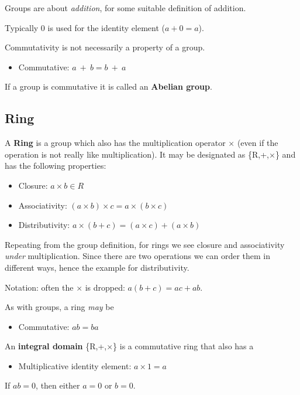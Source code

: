 \documentclass[11pt, oneside]{article}
\begin{document}
Groups are about \emph{addition}, for some suitable definition of addition.

Typically $0$ is used for the identity element ($a + 0 = a$).

Commutativity is not necessarily a property of a group.

\begin{itemize}
\item Commutative:       $a \ + \ b = b \ + \ a$
\end{itemize}

If a group is commutative it is called an \textbf{Abelian group}.

\subsection*{Ring}
A \textbf{Ring} is a group which also has the multiplication operator $\times$ (even if the operation is not really like multiplication).  It may be designated as \{R,+,$\times$\} and has the following properties:

\begin{itemize}
\item Closure:           $a \times b \in R$
\item Associativity:     $(a \times b) \times c = a \times (b \times c)$
\item Distributivity:    $a \times (b + c) = (a \times c) + (a \times b)$
\end{itemize}

Repeating from the group definition, for rings we see closure and associativity \emph{under} multiplication.  Since there are two operations we can order them in different ways, hence the example for distributivity.

Notation:  often the $\times$ is dropped:  $a(b + c) = ac + ab$.  

As with groups, a ring  \emph{may} be 
\begin{itemize}
\item Commutative:    $ab = ba$
\end{itemize}

An \textbf{integral domain} \{R,+,$\times$\} is a commutative ring that also has a
\begin{itemize}
\item Multiplicative identity element:    $a \times 1 = a$
\end{itemize}

If $ab = 0$, then either $a = 0$ or $b = 0$.
\end{document}
